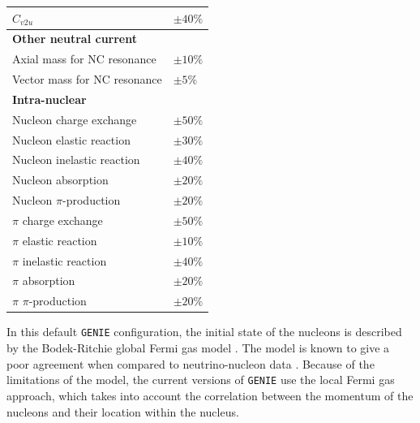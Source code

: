 \begin{table}[p!]
\begin{center}
\begin{small}
\begin{tabular}{l|l}
                $C_{v2u}$                                      & $\pm 40\%$                      \\[2mm] \hline
                \rule{0pt}{1.1\normalbaselineskip}\textbf{Other neutral current}                 &                                 \\[2mm]
                Axial mass for NC resonance                    & $\pm 10\%$                      \\[2mm]
                Vector mass for NC resonance                   & $\pm 5\%$                       \\[2mm] \hline
                \rule{0pt}{1.1\normalbaselineskip}\textbf{Intra-nuclear}                         &                                 \\[2mm]
                Nucleon charge exchange                        & $\pm 50\%$                      \\[2mm]
                Nucleon elastic reaction                       & $\pm 30\%$                      \\[2mm]
                Nucleon inelastic reaction                     & $\pm 40\%$                      \\[2mm]
                Nucleon absorption                             & $\pm 20\%$                      \\[2mm]
                Nucleon $\pi$-production                       & $\pm 20\%$                      \\[2mm]
                $\pi$ charge exchange                          & $\pm 50\%$                      \\[2mm]
                $\pi$ elastic reaction                         & $\pm 10\%$                      \\[2mm]
                $\pi$ inelastic reaction                       & $\pm 40\%$                      \\[2mm]
                $\pi$ absorption                               & $\pm 20\%$                      \\[2mm]
                $\pi$ $\pi$-production                         & $\pm 20\%$                     
            \end{tabular}
		\end{small}
	\end{center}
	\label{tab:xsec_genie_systs}
\end{table}

In this default \texttt{GENIE} configuration, the initial state of the nucleons is described by the Bodek-Ritchie global Fermi gas model \cite{Bodek1980}. The model is known to give a poor agreement when compared to neutrino-nucleon data \cite{Wilkinson2016}. Because of the limitations of the model, the current versions of \texttt{GENIE} use the local Fermi gas approach, which takes into account the correlation between the momentum of the nucleons and their location within the nucleus.

